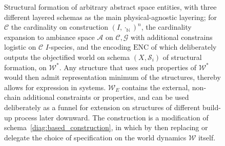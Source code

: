 \begin{figure}
	\centering
	\caption{Structural formation of arbitrary abstract space entities, with three different layered schemas as the main physical-agnostic layering; for $\mathcal{C}$ the cardinality on construction $(I,\cdot_{\mathbb{N}})^{n}$, the cardinality expansion to ambiance space $\mathcal{A}$ on $\mathcal{C},\mathcal{G}$ with additional constrains logistic on $\mathcal{C}$ $I$-species, and the encoding $\mathrm{ENC}$ of which deliberately outputs the objectified world on schema $(X,\mathcal{S}_{i})$ of structural formation, on $\mathcal{W}^{*}$. Any structure that uses such properties of $\mathcal{W}^{*}$ would then admit representation minimum of the structures, thereby allows for expression in systems. $\mathcal{W}_{E}$ contains the external, non-chain additional constraints or properties, and can be used deliberately as a funnel for extension on structures of different build-up process later downward. The construction is a modification of schema~\ref{diag:based_construction}, in which by then replacing or delegate the choice of specification on the world dynamics $\mathcal{W}$ itself.}
	\label{diag:based_construction_variational}
\end{figure}

